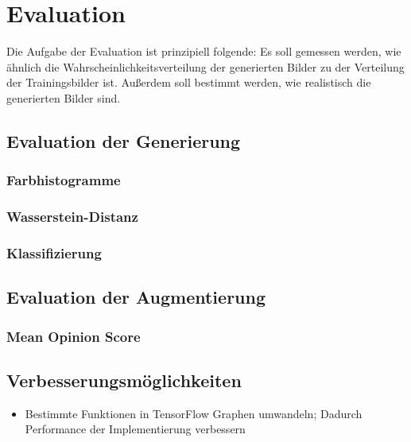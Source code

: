 \chapter{Evaluation}
Die Aufgabe der Evaluation ist prinzipiell folgende: Es soll gemessen werden, wie ähnlich die Wahrscheinlichkeitsverteilung der generierten Bilder zu der Verteilung der Trainingsbilder ist. Außerdem soll bestimmt werden, wie realistisch die generierten Bilder sind.

\label{chap:Evaluation}
\section{Evaluation der Generierung}
\subsection{Farbhistogramme}
\subsection{Wasserstein-Distanz}
\subsection{Klassifizierung}
\section{Evaluation der Augmentierung}
\subsection{Mean Opinion Score}

\section{Verbesserungsmöglichkeiten}
\begin{itemize}
   \item Bestimmte Funktionen in TensorFlow Graphen umwandeln; Dadurch Performance der Implementierung verbessern
\end{itemize}